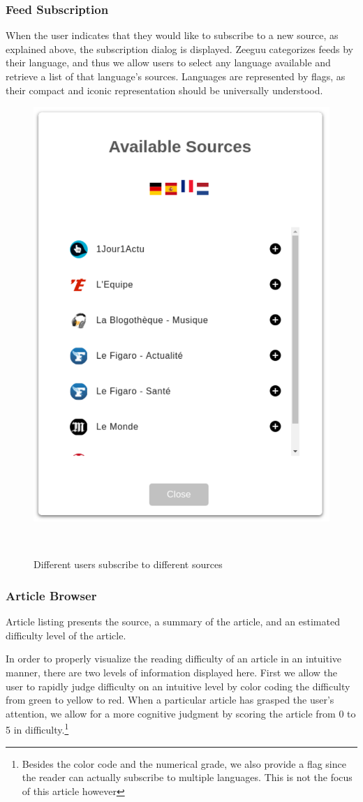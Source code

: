 \subsubsection{Feed Subscription}
When the user indicates that they would like to subscribe to a new source, as explained above, the subscription dialog is displayed. Zeeguu categorizes feeds by their language, and thus we allow users to select any language available and retrieve a list of that language's sources. Languages are represented by flags, as their compact and iconic representation should be universally understood.

\begin{figure}[h!]
\centering
  \includegraphics[width=0.4\columnwidth]{figures/available_sources}
  \caption{Different users subscribe to different sources}~\label{fig:registrations}
\end{figure}


\subsubsection{Article Browser}

Article listing presents the source, a summary of the article, and an estimated difficulty level of the article.

In order to properly visualize the reading difficulty of an article in an intuitive manner, there are two levels of information displayed here. First we allow the user to rapidly judge difficulty on an intuitive level by color coding the difficulty from green to yellow to red. When a particular article has grasped the user's attention, we allow for a more cognitive judgment by scoring the article from 0 to 5 in difficulty.\footnote{Besides the color code and the numerical grade, we also provide a flag since the reader can actually subscribe to multiple languages. This is not the focus of this article however}

